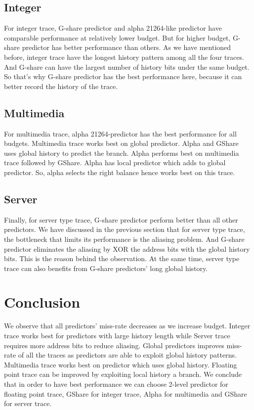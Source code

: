 \documentclass[conference]{IEEEtran}
\begin{document}
\subsection{Integer}
For integer trace, G-share predictor and alpha 21264-like predictor have comparable performance at relatively lower budget. But for higher budget, G-share predictor has better performance than others. As we have mentioned before, integer trace have the longest history pattern among all the four traces. And G-share can have the largest number of history bits under the same budget. So that's why G-share predictor has the best performance here, because it can better record the history of the trace.

\subsection{Multimedia}
For multimedia trace, alpha 21264-predictor has the best performance for all budgets. Multimedia trace works best on global predictor. Alpha and GShare uses global history to predict the branch. Alpha performs best on multimedia trace followed by GShare. Alpha has local predictor which adds to global predictor. So, alpha selects the right balance hence works best on this trace.

\subsection{Server}
Finally, for server type trace, G-share predictor perform better than all other predictors. We have discussed in the previous section that for server type trace, the bottleneck that limits its performance is the aliasing problem. And G-share predictor eliminates the aliasing by XOR the address bits with the global history bits. This is the reason behind the observation. At the same time, server type trace can also benefits from G-share predictors' long global history.


\section{Conclusion}
We observe that all predictors' miss-rate decreases as we increase budget. Integer trace works best for predictors with large history length while Server trace requires more address bits to reduce aliasing. Global predictors improves miss-rate of all the traces as predictors are able to exploit global history patterns. Multimedia trace works best on predictor which uses global history. Floating point trace can be improved by exploiting local history a branch. We conclude that in order to have best performance we can choose 2-level predictor for floating point trace, GShare for integer trace, Alpha for multimedia and GShare for server trace. 
\end{document}

